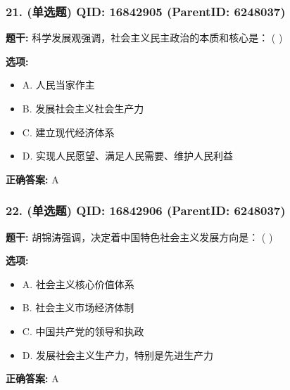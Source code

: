 \documentclass[12pt,UTF8]{ctexart}
\begin{document}
\subsubsection*{21. (单选题) \small QID: 16842905 (ParentID: 6248037)}

\textbf{题干:}
科学发展观强调，社会主义民主政治的本质和核心是： ( )



\textbf{选项:}
\begin{itemize}[leftmargin=*]

  \item A. 人民当家作主

  \item B. 发展社会主义社会生产力

  \item C. 建立现代经济体系

  \item D. 实现人民愿望、满足人民需要、维护人民利益

\end{itemize}

\textbf{正确答案:}
A

\vspace{0.3em}\hrulefill\vspace{0.7em}

\subsubsection*{22. (单选题) \small QID: 16842906 (ParentID: 6248037)}

\textbf{题干:}
胡锦涛强调，决定着中国特色社会主义发展方向是： ( )



\textbf{选项:}
\begin{itemize}[leftmargin=*]

  \item A. 社会主义核心价值体系

  \item B. 社会主义市场经济体制

  \item C. 中国共产党的领导和执政

  \item D. 发展社会主义生产力，特别是先进生产力

\end{itemize}

\textbf{正确答案:}
A

\vspace{0.3em}\hrulefill\vspace{0.7em}
\end{document}
